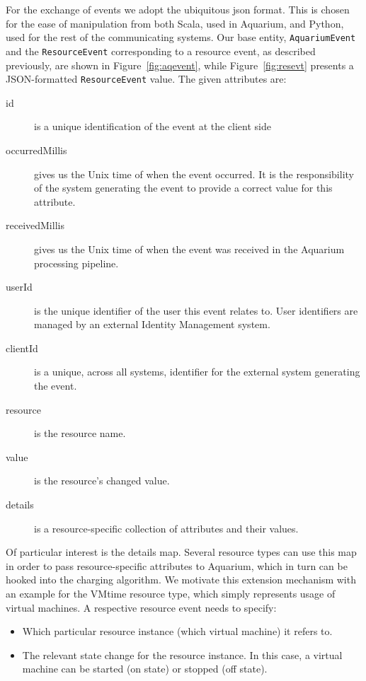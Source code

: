 \documentclass[preprint,10pt]{sigplanconf}
\begin{document}
For the exchange of events we adopt the ubiquitous {\sc json} format. This is chosen for the ease of manipulation from both Scala, used in Aquarium, and Python, used for the rest of the communicating systems. Our base entity, \texttt{AquariumEvent} and the \texttt{ResourceEvent} corresponding to a resource event, as described previously, are shown in Figure~\ref{fig:aqevent}, while Figure~\ref{fig:resevt} presents a JSON-formatted \texttt{ResourceEvent} value. The given attributes are:

\begin{description}

\item[id] is a unique identification of the event at the client side

\item[occurredMillis] gives us the Unix time of when the event occurred. It is the responsibility of the system generating the event to provide a correct value for this attribute.

\item[receivedMillis] gives us the Unix time of when the event was received in the Aquarium processing pipeline.

\item[userId] is the unique identifier of the user this event relates to. User identifiers are managed by an external Identity Management system.

\item[clientId] is a unique, across all systems, identifier for the external system generating the event.

\item[resource] is the resource name.

\item[value] is the resource's changed value.

\item[details] is a resource-specific collection of  attributes and their values.
\end{description}

Of particular interest is the \textsf{details} map. Several resource types can use this map in order to pass resource-specific attributes to Aquarium, which in turn can be hooked into the charging algorithm. We motivate this extension mechanism with an example for the \textsf{VMtime} resource type, which simply represents usage of virtual machines. A respective resource event needs to specify:
\begin{itemize}
\item Which particular resource instance (which virtual machine) it refers to.
\item The relevant state change for the resource instance. In this case, a virtual machine can be started (\textsf{on} state) or stopped (\textsf{off} state).
\end{itemize}
\end{document}
